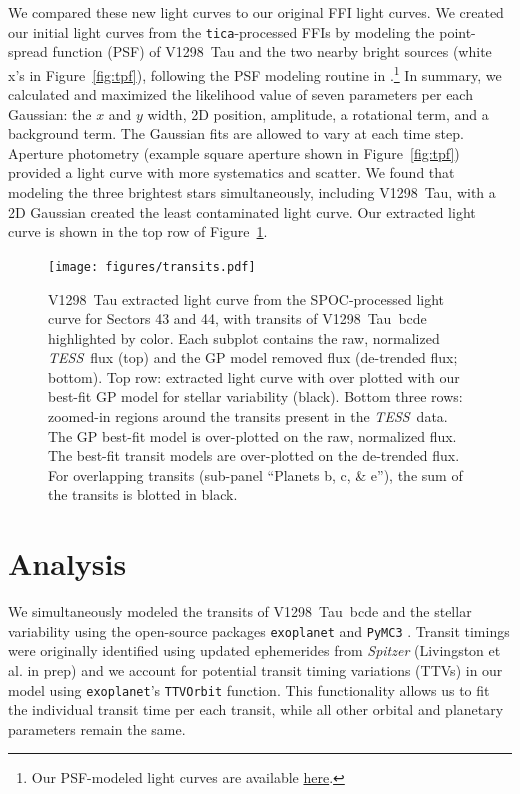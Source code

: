 \documentclass[linenumbers,twocolumn]{aastex631}
\newcommand{\tess}{\textit{TESS}}
\newcommand{\sname}{V1298~Tau\xspace}
\newcommand{\allplanets}{V1298~Tau~bcde\xspace}
\newcommand{\exoplanet}{\texttt{exoplanet}\xspace}
\begin{document}
We compared these new light curves to our original FFI light curves. We created our initial light curves from the \texttt{tica}-processed FFIs by modeling the point-spread function (PSF) of \sname and the two nearby bright sources (white x's in Figure~\ref{fig:tpf}), following the PSF modeling routine in \cite{feinstein19}.\footnote{Our PSF-modeled light curves are available \href{https://github.com/afeinstein20/v1298tau_tess/tree/main/lightcurves}{here}.} In summary, we calculated and maximized the likelihood value of seven parameters per each Gaussian: the $x$ and $y$ width, 2D position, amplitude, a rotational term, and a background term. The Gaussian fits are allowed to vary at each time step. Aperture photometry (example square aperture shown in Figure~\ref{fig:tpf}) provided a light curve with more systematics and scatter. We found that modeling the three brightest stars simultaneously, including \sname, with a 2D Gaussian created the least contaminated light curve. Our extracted light curve is shown in the top row of Figure~\ref{fig:transits}.

\begin{figure}[hbtp]
\begin{center}
\texttt{[image: figures/transits.pdf]}
\caption{\sname extracted light curve from the SPOC-processed light curve for Sectors 43 and 44, with transits of \allplanets highlighted by color. Each subplot contains the raw, normalized \tess\ flux (top) and the GP model removed flux (de-trended flux; bottom). Top row: extracted light curve with over plotted with our best-fit GP model for stellar variability (black). Bottom three rows: zoomed-in regions around the transits present in the \tess\ data. The GP best-fit model is over-plotted on the raw, normalized flux. The best-fit transit models are over-plotted on the de-trended flux. For overlapping transits (sub-panel ``Planets b, c, \& e''), the sum of the transits is blotted in black.} \label{fig:transits}
\end{center}
\end{figure}

\section{Analysis} \label{sec:analysis}

We simultaneously modeled the transits of \allplanets and the stellar variability using the open-source packages \exoplanet \citep{exoplanet2019, exoplanet2021} and \texttt{PyMC3} \citep{Salvatier16}. Transit timings were originally identified using updated ephemerides from \textit{Spitzer} (Livingston et al. in prep) and we account for potential transit timing variations (TTVs) in our model using \texttt{exoplanet}'s \texttt{TTVOrbit} function. This functionality allows us to fit the individual transit time per each transit, while all other orbital and planetary parameters remain the same.
\end{document}
